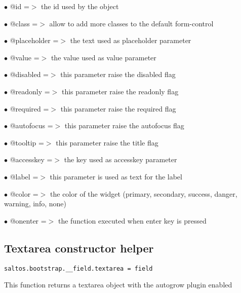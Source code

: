 \documentclass[a4paper]{book}
\begin{document}
\begin{compactitem}
\item[\color{myblue}$\bullet$] @id          =$>$ the id used by the object
\item[\color{myblue}$\bullet$] @class       =$>$ allow to add more classes to the default form-control
\item[\color{myblue}$\bullet$] @placeholder =$>$ the text used as placeholder parameter
\item[\color{myblue}$\bullet$] @value       =$>$ the value used as value parameter
\item[\color{myblue}$\bullet$] @disabled    =$>$ this parameter raise the disabled flag
\item[\color{myblue}$\bullet$] @readonly    =$>$ this parameter raise the readonly flag
\item[\color{myblue}$\bullet$] @required    =$>$ this parameter raise the required flag
\item[\color{myblue}$\bullet$] @autofocus   =$>$ this parameter raise the autofocus flag
\item[\color{myblue}$\bullet$] @tooltip     =$>$ this parameter raise the title flag
\item[\color{myblue}$\bullet$] @accesskey   =$>$ the key used as accesskey parameter
\item[\color{myblue}$\bullet$] @label       =$>$ this parameter is used as text for the label
\item[\color{myblue}$\bullet$] @color       =$>$ the color of the widget (primary, secondary, success, danger, warning, info, none)
\item[\color{myblue}$\bullet$] @onenter     =$>$ the function executed when enter key is pressed
\end{compactitem}

\hypertarget{toc468}{}
\subsection{Textarea constructor helper}

\begin{lstlisting}
saltos.bootstrap.__field.textarea = field
\end{lstlisting}

This function returns a textarea object with the autogrow plugin enabled
\end{document}
